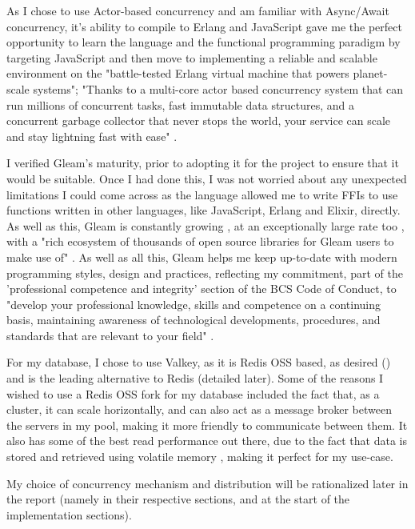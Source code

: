\documentclass[]{final}
\begin{document}
As I chose to use Actor-based concurrency and am familiar with
Async/Await concurrency, it's ability to compile to Erlang and
JavaScript gave me the perfect opportunity to learn the language and
the functional programming paradigm by targeting JavaScript and then
move to implementing a reliable and scalable environment on the
"battle-tested Erlang virtual machine that powers planet-scale systems";
"Thanks to a multi-core actor based concurrency system that can run millions
of concurrent tasks, fast immutable data structures, and a concurrent garbage
collector that never stops the world, your service can scale and stay lightning
fast with ease" \cite{noauthor_gleam_nodate}.

I verified Gleam's maturity, prior to adopting it for the project to ensure
that it would be suitable. Once I had done this, I was not worried about
any unexpected limitations I could come across as the language allowed
me to write FFIs to use functions written in other languages, like JavaScript,
Erlang and Elixir, directly. As well as this, Gleam is constantly growing \cite{noauthor_news_nodate},
at an exceptionally large rate too \cite{shashtari_why_2024}, with a "rich ecosystem of thousands of
open source libraries for Gleam users to make use of" \cite{noauthor_gleam_nodate}.
As well as all this, Gleam helps me keep up-to-date with modern
programming styles, design and practices, reflecting my commitment,
part of the 'professional competence and integrity' section of the
BCS Code of Conduct, to
"develop your professional knowledge, skills and competence on a continuing
basis, maintaining awareness of technological developments, procedures, and
standards that are relevant to your field" \cite{noauthor_bcs_nodate}.

For my database, I chose to use Valkey, as it is Redis OSS based, as
desired {\hypersetup{linkcolor=teal}(\pageref{REDISOSS})} and is
the leading alternative to Redis (detailed later).
Some of the reasons I wished to use a Redis OSS fork for my database included
the fact that,
as a cluster, it can scale horizontally, and can also act as a message
broker between the servers in my pool, making it more friendly to communicate
between them. It also has some of the best read
performance out there, due to the fact that data is stored and retrieved
using volatile memory \cite{department_of_information_systems_university_of_nizwa_sultanate_of_oman_study_2022},
making it perfect for my use-case.

My choice of concurrency mechanism and distribution will be
rationalized later in the report (namely in their respective sections,
and at the start of the implementation sections).
\end{document}
